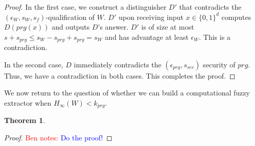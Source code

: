 \documentclass[11pt]{article}
\newcommand{\class}[1]{{\ensuremath{\mathsf{#1}}}}
\newcommand{\sketch}{\ensuremath{\class{SS}}\xspace}
\newcommand{\rec}{\ensuremath{\class{Rec}}\xspace}
\newcommand{\hill}{\ensuremath{\mathtt{HILL}}\xspace}
\newcommand{\Hoo}{\mathrm{H}_\infty}
\newtheorem{theorem}{Theorem}[section]
\newtheorem{definition}[theorem]{Definition}
\newcommand{\authnote}[2]{{\textcolor{red}{\textsf{#1 notes: }\textcolor{blue}{ #2}}\marginpar{\textcolor{red}{\textbf{!!!!!}}}}}
\newcommand{\authnote}[2]{}
\newcommand{\bnote}[1]{{\authnote{Ben}{#1}}}
\begin{document}
{\begin{proof}
In the first case, we construct a distinguisher $D'$ that contradicts the $(\epsilon_W, s_W, s_{f})$-qualification of $W$.  $D'$ upon receiving input $x\in \{0,1\}^d$ computes $D(prg(x))$ and outputs $D$'s answer.  $D'$ is of size at most $s + s_{prg} \leq s_W-s_{prg}+s_{prg} = s_W$ and has advantage at least $\epsilon_W$.  This is a contradiction.

In the second case, $D$ immediately contradicts the $(\epsilon_{prg}, s_{sec})$ security of $prg$.  Thus, we have a contradiction in both cases.  This completes the proof.
\end{proof}

We now return to the question of whether we can build a computational fuzzy extractor when $H_\infty(W)<k_{prg}$.
\begin{theorem}

\end{theorem}
\begin{proof}
\bnote{Do the proof!}
\end{proof}
}
\end{document}
